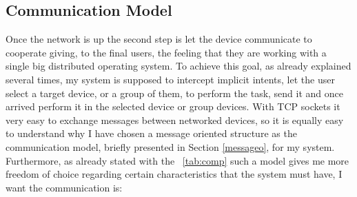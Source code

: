  \subsection{Communication Model}
 Once the network is up the second step is let the device communicate to cooperate giving, to the final users, the feeling that they are working with a single big distributed operating system. To achieve this goal, as already explained several times, my system is supposed to intercept implicit intents, let the user select a target device, or a group of them, to perform the task, send it and once arrived perform it in the selected device or group devices. With TCP sockets it very easy to exchange messages between networked devices, so it is equally easy to understand why I have chosen a message oriented structure as the communication model, briefly presented in Section \ref{messageo}, for my system. Furthermore, as already stated with the \tablename~\ref{tab:comp} such a model gives me more freedom of choice regarding certain characteristics that the system must have, I want the communication is:

